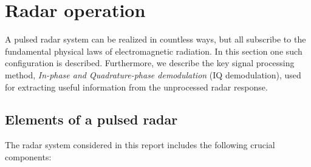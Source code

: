 













\section{Radar operation}

A pulsed radar system can be realized in countless ways, but all subscribe to the fundamental physical laws of electromagnetic radiation. In this section one such configuration is described. Furthermore, we describe the key signal processing method, \emph{In-phase and Quadrature-phase demodulation} (IQ demodulation), used for extracting useful information from the unprocessed radar response. 

\subsection{Elements of a pulsed radar}
The radar system considered in this report includes the following crucial components:

